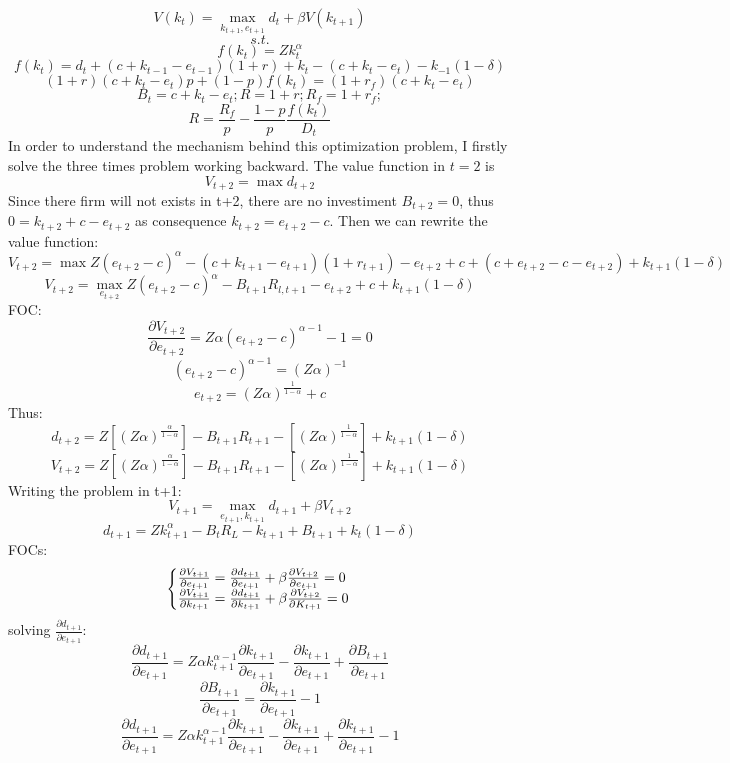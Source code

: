 \documentclass[12pt]{article}
\begin{document}
\[V(k_{t}) = \max_{k_{t+1}, e_{t+1}} d_t + \beta V(k_{t+1})\]
\[s.t.\]
\[f(k_t) = Z k_t^\alpha\]
\[f(k_t) = d_t + (c+k_{t-1}-e_{t-1})(1+r) + k_{t} - (c + k_{t}- e_{t}) - k_{-1}(1-\delta)\]
\[(1+r)(c+k_t -e_t)p + (1-p)f(k_t) = (1+r_f)(c+k_t -e_t) \]
\[B_t = c+k_t-e_t; R= 1+r; R_f= 1 + r_f;  \]
\[R=\frac{R_f}{p}  -\frac{ 1-p }{ p }\frac{f(k_t)}{D_t}\]
In order to understand the mechanism behind this optimization problem, I firstly solve the three times problem working
backward.
The value function in \(t=2\) is 
\[ V_{t+2} =  \max d_{t+2}\]
Since there firm will not exists in t+2, there are no investiment \(B_{t+2}=0\), thus \(0=k_{t+2}+c-e_{t+2}\) as
consequence \(k_{t+2} = e_{t+2} - c\). Then we can rewrite the value function:
\[ V_{t+2} = \max Z(e_{t+2} - c)^\alpha - (c+k_{t+1}-e_{t+1})(1+r_{t+1}) - e_{t+2} + c + (c + e_{t+2} - c - e_{t+2}) +
k_{t+1}(1-\delta) \]
\[V_{t+2} = \max_{e_{t+2}} Z(e_{t+2} - c)^\alpha - B_{t+1}R_{l,t+1} - e_{t+2} + c + k_{t+1}(1-\delta) \]
FOC:
\[\frac{\partial V_{t+2}}{\partial e_{t+2}} = Z \alpha (e_{t+2} - c)^{\alpha-1} - 1 = 0\]
\[ (e_{t+2} - c)^{\alpha-1}= (Z \alpha)^{-1}\]
\[ e_{t+2} = (Z \alpha)^{\frac{1}{1-\alpha}}+c\]
Thus:
\[d_{t+2} = Z\left[(Z \alpha)^{\frac{\alpha}{1-\alpha}}\right]  - B_{t+1}R_{t+1} -  \left[(Z
\alpha)^{\frac{1}{1-\alpha}}\right] + k_{t+1}(1-\delta) \]
\[V_{t+2} = Z\left[(Z \alpha)^{\frac{\alpha}{1-\alpha}}\right]  - B_{t+1}R_{t+1} -  \left[(Z
\alpha)^{\frac{1}{1-\alpha}}\right] + k_{t+1}(1-\delta) \]
Writing the problem in t+1:
\[V_{t+1} = \max_{e_{t+1},k_{t+1}} d_{t+1} + \beta V_{t+2}\]
\[d_{t+1} = Zk^\alpha_{t+1} - B_t R_L - k_{t+1} + B_{t+1} + k_t(1-\delta)\]
FOCs:
\begin{align*}
    \left\{\begin{array}{@{}l@{}}
        \frac{\partial V_{t+1}}{\partial e_{t+1}} = \frac{\partial d_{t+1}}{\partial e_{t+1}} + \beta \frac{\partial
            V_{t+2}}{\partial e_{t+1}} = 0  \\
        \frac{\partial V_{t+1}}{\partial k_{t+1}} = \frac{\partial d_{t+1}}{\partial k_{t+1}} + \beta \frac{\partial
            V_{t+2}}{\partial K_{t+1}} = 0 \\
    \end{array} \right .\,
\end{align*}
solving \(\frac{\partial d_{t+1}}{\partial e_{t+1}}\):
\[\frac{\partial d_{t+1}}{\partial e_{t+1}} = Z \alpha k_{t+1} ^{\alpha-1}\frac{\partial k_{t+1}}{\partial e_{t+1}}
 - \frac{\partial k_{t+1}}{\partial e_{t+1}} + \frac{\partial B_{t+1}}{\partial e_{t+1}}\]
\[\frac{\partial B_{t+1}}{\partial e_{t+1}} = \frac{\partial k_{t+1}}{\partial e_{t+1}} - 1\]
\[\frac{\partial d_{t+1}}{\partial e_{t+1}} = Z \alpha k_{t+1} ^{\alpha-1}\frac{\partial k_{t+1}}{\partial e_{t+1}} -
\frac{\partial k_{t+1}}{\partial e_{t+1}} + \frac{\partial k_{t+1}}{\partial e_{t+1}} - 1\]
\end{document}
